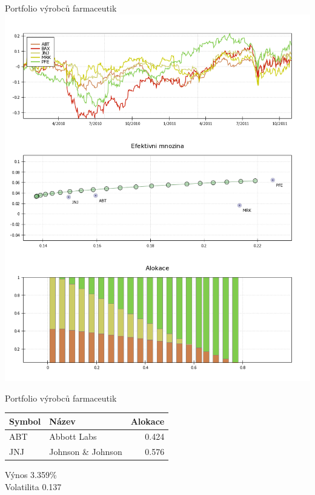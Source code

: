 \begin{frame}{Portfolio výrobců farmaceutik}
        \includegraphics[height=0.9\textheight]{drugs1.png}
\end{frame}

\begin{frame}{Portfolio výrobců farmaceutik}
      \begin{tabular}{|l|l|r|}
        \hline
        Symbol&Název&Alokace\\\hline\hline
        ABT&Abbott Labs &0.424\\\hline
        JNJ&Johnson \& Johnson &0.576\\\hline
      \end{tabular}
      
      Výnos 3.359\%\\
      Volatilita 0.137
\end{frame}

